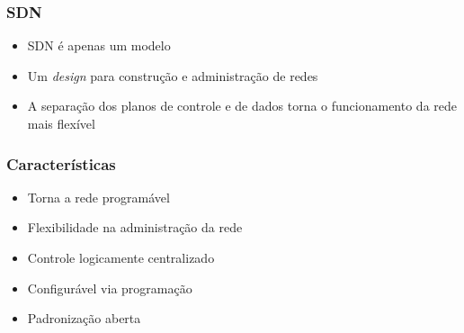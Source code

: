 %
%
\begin{frame}\frametitle{SDN}

    \begin{itemize}
        \setlength{\itemsep}{1cm}
        \item SDN é apenas um modelo
        \item Um \emph{design} para construção e administração de redes
        \item A separação dos planos de controle e de dados torna o 
              funcionamento da rede mais flexível
    \end{itemize}
\end{frame}

%
%
\begin{frame}\frametitle{Características}

    \begin{itemize}
        \setlength{\itemsep}{.5cm}
        \item Torna a rede programável
        \item Flexibilidade na administração da rede
        \item Controle logicamente centralizado
        \item Configurável via programação
        \item Padronização aberta 
    \end{itemize}
\end{frame}

